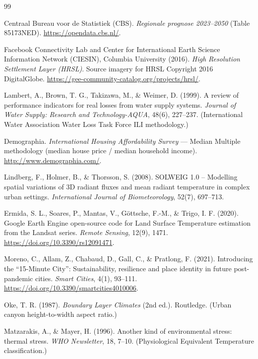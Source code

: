 \documentclass[11pt]{article}
\begin{document}
\begin{thebibliography}{99}

 Centraal Bureau voor de Statistiek (CBS). \textit{Regionale prognose 2023--2050} (Table 85173NED). \url{https://opendata.cbs.nl/}.

 Facebook Connectivity Lab and Center for International Earth Science Information Network (CIESIN), Columbia University (2016). \textit{High Resolution Settlement Layer (HRSL)}. Source imagery for HRSL Copyright 2016 DigitalGlobe. \url{https://gee-community-catalog.org/projects/hrsl/}.

 Lambert, A., Brown, T. G., Takizawa, M., \& Weimer, D. (1999). A review of performance indicators for real losses from water supply systems. \textit{Journal of Water Supply: Research and Technology-AQUA}, 48(6), 227--237. (International Water Association Water Loss Task Force ILI methodology.)

 Demographia. \textit{International Housing Affordability Survey} --- Median Multiple methodology (median house price / median household income). \url{http://www.demographia.com/}.

 Lindberg, F., Holmer, B., \& Thorsson, S. (2008). SOLWEIG 1.0 -- Modelling spatial variations of 3D radiant fluxes and mean radiant temperature in complex urban settings. \textit{International Journal of Biometeorology}, 52(7), 697--713.

 Ermida, S. L., Soares, P., Mantas, V., Göttsche, F.-M., \& Trigo, I. F. (2020). Google Earth Engine open-source code for Land Surface Temperature estimation from the Landsat series. \textit{Remote Sensing}, 12(9), 1471. \url{https://doi.org/10.3390/rs12091471}.

 Moreno, C., Allam, Z., Chabaud, D., Gall, C., \& Pratlong, F. (2021). Introducing the ``15-Minute City'': Sustainability, resilience and place identity in future post-pandemic cities. \textit{Smart Cities}, 4(1), 93--111. \url{https://doi.org/10.3390/smartcities4010006}.

 Oke, T. R. (1987). \textit{Boundary Layer Climates} (2nd ed.). Routledge. (Urban canyon height-to-width aspect ratio.)

 Matzarakis, A., \& Mayer, H. (1996). Another kind of environmental stress: thermal stress. \textit{WHO Newsletter}, 18, 7--10. (Physiological Equivalent Temperature classification.)


\end{thebibliography}
\end{document}
